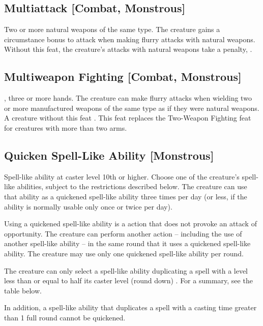 \subsection{Multiattack [Combat, Monstrous]}
 Two or more natural weapons of the same type.
 The creature gains a  circumstance bonus to attack when making flurry attacks with natural weapons.
 Without this feat, the creature's  attacks with natural weapons take a  penalty, .

\subsection{Multiweapon Fighting [Combat, Monstrous]}
 , three or more hands.
 The creature can make flurry attacks when wielding two or more manufactured weapons of the same type as if they were natural weapons.
 A creature without this feat .
 This feat replaces the Two-Weapon Fighting feat for creatures with more than two arms.

\subsection{Quicken Spell-Like Ability [Monstrous]}
 Spell-like ability at caster level 10th or higher.
 Choose one of the creature's spell-like abilities, subject to the restrictions described below. The creature can use that ability as a quickened spell-like ability three times per day (or less, if the ability is normally usable only once or twice per day).

Using a quickened spell-like ability is a  action that does not provoke an attack of opportunity. The creature can perform another action -- including the use of another spell-like ability -- in the same round that it uses a quickened spell-like ability. The creature may use only one quickened spell-like ability per round.

The creature can only select a spell-like ability duplicating a spell with a level less than or equal to half its caster level (round down) . For a summary, see the table below.

In addition, a spell-like ability that duplicates a spell with a casting time greater than 1 full round cannot be quickened.

